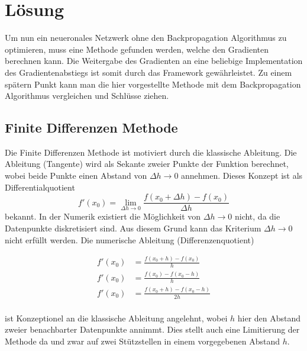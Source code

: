 %
%
%
\section{Lösung
\label{ableitung:section:loesung}}
Um nun ein neueronales Netzwerk ohne den Backpropagation Algorithmus zu optimieren, muss eine Methode gefunden werden, welche den Gradienten berechnen kann. Die Weitergabe des Gradienten an eine beliebige Implementation des Gradientenabstiegs ist somit durch das Framework gewährleistet. Zu einem spätern Punkt kann man die hier vorgestellte Methode mit dem Backpropagation Algorithmus vergleichen und Schlüsse ziehen.
\subsection{Finite Differenzen Methode}
Die Finite Differenzen Methode ist motiviert durch die klassische Ableitung. Die Ableitung (Tangente) wird als Sekante zweier Punkte der Funktion berechnet, wobei beide Punkte einen Abstand von $\Delta h \rightarrow 0$ annehmen.
Dieses Konzept ist als Differentialquotient
\begin{equation}
f'(x_0) = \lim_{{\Delta h} \rightarrow 0} \frac{f(x_0+\Delta h) - f(x_0)}{\Delta h}
\label{ableitung:equations:differentialquotient}
\end{equation}
bekannt. 
In der Numerik existiert die Möglichkeit von $\Delta h \rightarrow 0$ nicht, da die Datenpunkte diskretisiert sind. Aus diesem Grund kann das Kriterium $\Delta h \rightarrow 0$ nicht erfüllt werden. Die numerische Ableitung (Differenzenquotient)

\begin{equation}
\begin{split}
f'(x_0) &= \frac{f(x_0 + h) - f(x_0)}{h} \\
f'(x_0) &= \frac{f(x_0) - f(x_0 - h)}{h} \\
f'(x_0) &= \frac{f(x_0 + h) - f(x_0 - h)}{2h} \\
\end{split}
\label{ableitung:equations:differenzenquotient}
\end{equation}

ist Konzeptionel an die klassische Ableitung angelehnt, wobei $h$ hier den Abstand zweier benachbarter Datenpunkte annimmt. Dies stellt auch eine Limitierung der Methode da und zwar auf zwei Stützstellen in einem vorgegebenen Abstand $h$.


